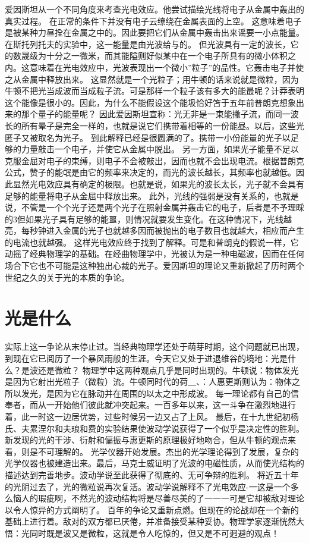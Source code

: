 爱因斯坦从一个不同角度来考查光电效应。他尝试描绘光线将电子从金属中轰出的真实过程。
在正常的条件下并没有电子云缭绕在金属表面的上空。
这意味着电子是被某种力昼拴在金属之中的。因此要把它们从金属中轰击出来谣要一小点能量。在斯托列托夫的实验中，这一能量是由光波给与的。
但光波具有一定的波长，它的数晟级为十分之一微米，而其能隘则好似某中在一个电子所具有的微小体积之内。这意味着在光电效应中，光波表现出一个微小”粒子”的品性。它轰击电子并使之从金属中释放出来。
这显然就是一个光粒子；用牛顿的话来说就是微粒，因为牛顿不把光当成波而当成粒子流。可是那样一个粒子该有多大的能最呢？计莽表明这个能像是很小的。因此，为什么不能假设这个能圾恰好笘于五年前普朗克想象出来的那个量子的能量呢？
因此爱因斯坦宣称：光无非是一束能撇子流，而同一波长的所有晕子是完全一样的，也就是说它们携带着相等的一份能昼。以后，这些光匿子又被取名为光子。
到此解释已经是很圆满的了。携带一小份能量的光子以足够的力量敲击一个电子，并使它从金属中脱出。
另一方面，如果光子能量不足以克服金屈对电子的束缚，则电子不会被敲出，因而也就不会出现电流。根据普朗克公式，赞子的能氓是由它的频率来决定的，而光的波长越长，其频率也就越低。因此显然光电效应具有确定的极限。也就是说，如果光的波长太长，光子就不会具有足够的能量将电子从金屈中释放出来。
此外，光线的强弱是没有关系的，也就是说，不管是一个个光子还是两个光子在照射金属并轰击它的电子，后者是不予理睬的3但如果光子具有足够的能噩，则情况就要发生变化。在这种情况下，光线越亮，每秒钟进入金属的光子也就越多因而被抛出的电子数目也就越大，相应而产生的电流也就越强。
这样光电效应终于找到了解释。可是和普朗克的假说一样，它动摇了经典物理学的基础。在经曲物理学中，光被认为是一种电磁波，因而在任何场合下它也不可能是这种独出心裁的光子。爱因斯坦的理论又重新掀起了历时两个世纪之久的关于光的本质的争论。

\section{光是什么}

实际上这一争论从末停止过。当经典物理学还处于萌芽时期，这个问题就已出现，到现在它已阅历了一个暴风雨般的生涯。今天它又处于进退维谷的境地：光是什么？是波还是微粒？
物理学中这两种观点几乎是同时出现的。牛顿说：物体发光是因为它射出光粒子（微粒）流。牛顿同时代的荷＿、：人惠更斯则认为：物体之所以发光，是因为它在脉动并在周围的以太之中形成波。
每一理论都有自己的信奉者，而从一开始他们彼此就冲突起来。一百多年以来，这一斗争在激烈地进行着，此一时这一边居优势，过些时候另一边又占了上风。
最后，在十九世纪初杨氏、夫累涅尔和夫琅和费的实验结果使波动学说获得了一个似乎是决定性的胜利。新发现的光的干涉、衍射和偏振与惠更斯的原理极好地吻合，但从牛顿的观点来看，则是不可理解的。
光学仪器开始发展。杰出的光学理论得到了发展，复杂的光学仪器也被建造出来。最后，马克士威证明了光波的电磁性质，从而使光结构的描述达到完善地步。波动学说至此获得了彻底的、无可争辩的胜利。
将近五十年的光阴过去了，光的微粒说再次复活。波动学说解释不了光电效应-一这是一个多么恼人的瑕疵啊，不然光的波动结构将是尽善尽美的了一一一可是它却被敌对理论以令人惊异的方式阐明了。
百年的争论又重新点燃。但现在的论战却在一个新的基础上进行着。敌对的双方都已厌倦，并准备接受某种妥协。物理学家逐渐恍然大悟：光同时既是波又是微粒，这就是令人吃惊的，但又是不可迥避的观点！


